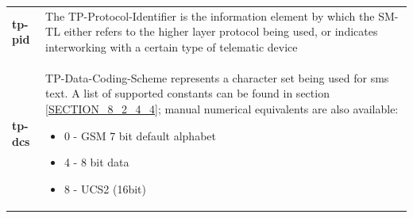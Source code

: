 \documentclass[a4paper,latin]{paper}
\begin{document}
\begin{tabularx}{\textwidth}{ | l | X |}
	\textbf{tp-pid}				& The TP-Protocol-Identifier is the information element by which the SM-TL either refers to the higher layer protocol being 
						  used, or indicates interworking with a certain type of telematic device \\ 
	\textbf{tp-dcs}				& TP-Data-Coding-Scheme represents a character set being used for \acrshort{sms} text. A list of supported constants can be found in
                                                  section \ref{SECTION_8_2_4_4}; manual numerical equivalents are also available:
 	  					  \begin{itemize}
						  	\setlength{\itemsep}{0pt}
							\setlength{\parskip}{0pt}
							\setlength{\parsep}{0pt}
							\item 0 - GSM 7 bit default alphabet
							\item 4 - 8 bit data
							\item 8 - UCS2 (16bit)
						    \end{itemize} \\ 
	\hline
\end{tabularx}
\clearpage
\end{document}
